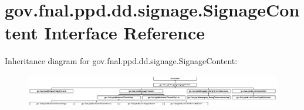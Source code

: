 \hypertarget{interfacegov_1_1fnal_1_1ppd_1_1dd_1_1signage_1_1SignageContent}{\section{gov.\-fnal.\-ppd.\-dd.\-signage.\-Signage\-Content Interface Reference}
\label{interfacegov_1_1fnal_1_1ppd_1_1dd_1_1signage_1_1SignageContent}
}
Inheritance diagram for gov.\-fnal.\-ppd.\-dd.\-signage.\-Signage\-Content\-:\begin{figure}[H]
\begin{center}
\leavevmode
\includegraphics[height=1.444788cm]{interfacegov_1_1fnal_1_1ppd_1_1dd_1_1signage_1_1SignageContent}
\end{center}
\end{figure}
